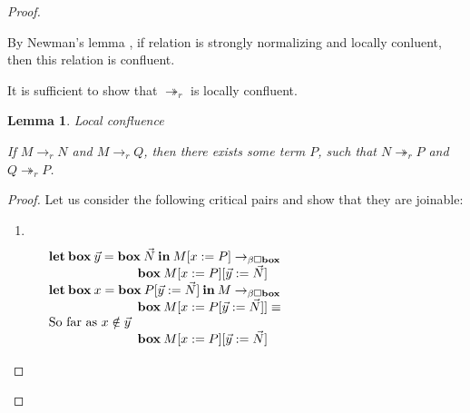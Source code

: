 \documentclass[a4paper]{article}
\newtheorem{lemma}{Lemma}
\begin{document}
\begin{proof}
  $ $

By Newman's lemma \cite{Morten}, if relation is strongly normalizing and locally conluent, then this relation is confluent.

It is sufficient to show that $\twoheadrightarrow_r$ is locally confluent.

\begin{lemma} Local confluence

If $M \rightarrow_{r} N$ and $M \rightarrow_{r} Q$, then there exists some term $P$,
such that $N \twoheadrightarrow_{r} P$ and $Q \twoheadrightarrow_{r} P$.

\end{lemma}

\begin{proof}

Let us consider the following critical pairs and show that they are joinable:

\begin{enumerate}
\item $ $ \\


\vspace{\baselineskip}

$\begin{array}{lll}
&{\bf let \: box \:} \vec{y} = {\bf box \:} \vec{N} {\: \bf in \:} M [x := P] \rightarrow_{\beta \Box {\bf box}}& \\
&\quad\quad\quad\quad\quad\quad\quad {\bf box \:} M [x := P] [\vec{y} := \vec{N}]& \\
&{\bf let \: box \:} x = {\bf box \:} P [\vec{y} := \vec{N}] {\: \bf in \:} M \rightarrow_{\beta \Box {\bf box}}& \\
&\quad\quad\quad\quad\quad\quad\quad {\bf box \:} M [x := P[\vec{y} := \vec{N}]] \equiv & \\
&\text{So far as $x \notin \vec{y}$}& \\
&\quad\quad\quad\quad\quad\quad\quad {\bf box \:} M [x := P] [\vec{y} := \vec{N}] & \\
\end{array}$


\end{enumerate}
\end{proof}
\end{proof}
\end{document}
